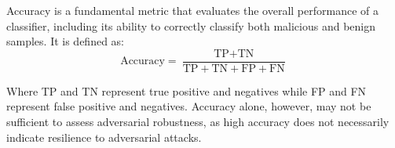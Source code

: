 \documentclass[10pt,twocolumn]{article}
\begin{document}
Accuracy is a fundamental metric that evaluates the overall performance of a classifier, including its ability to correctly classify both malicious and benign samples. It is defined as:
\[
\text{Accuracy} = \frac{\text{TP} + \text{TN}}{\text{TP} + \text{TN} + \text{FP} + \text{FN}}
\]

Where TP and TN represent true positive and negatives while FP and FN represent false positive and negatives.
Accuracy alone, however, may not be sufficient to assess adversarial robustness, as high accuracy does not necessarily indicate resilience to adversarial attacks.



\printbibliography

\appendix

\clearpage

\onecolumn
\end{document}
